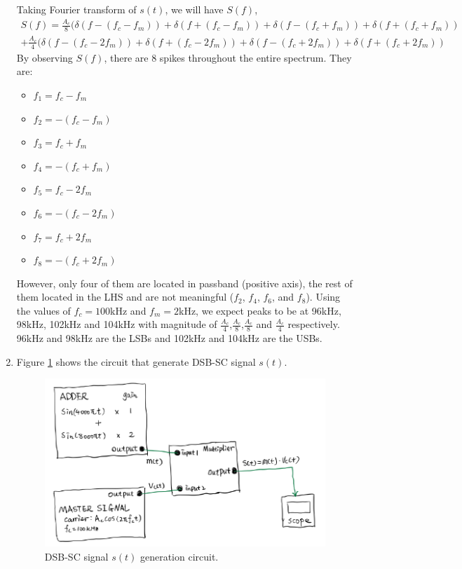 \documentclass[11pt]{article}
\begin{document}
\begin{enumerate}[label=(\alph*)]
\begin{itemize}
\end{itemize}
Taking Fourier transform of $s(t)$, we will have $S(f)$,
     \begin{align*}
    S(f)= \frac{A_c}{8} (\delta (f-(f_c-f_m)) +\delta (f+(f_c-f_m)) +\delta (f-(f_c+f_m)) +\delta (f+(f_c+f_m))\\
    +\frac{A_c}{4} (\delta (f-(f_c-2f_m)) +\delta (f+(f_c-2f_m)) +\delta (f-(f_c+2f_m)) +\delta (f+(f_c+2f_m))
    \end{align*}
By observing $S(f)$, there are 8 spikes throughout the entire spectrum. They are: 
\begin{multicols}{2}
\begin{itemize}
    \item $f_1=f_c-f_m$
    \item $f_2=-(f_c-f_m)$
    \item $f_3=f_c+f_m$
    \item $f_4=-(f_c+f_m)$
    \item $f_5=f_c-2f_m$
    \item $f_6=-(f_c-2f_m)$
    \item $f_7=f_c+2f_m$
    \item $f_8=-(f_c+2f_m)$
\end{itemize}
\end{multicols}
However, only four of them are located in passband (positive axis), the rest of them located in the LHS and are not meaningful ($f_2$, $f_4$, $f_6$, and $f_8$). Using the values of $f_c = 100$kHz and $f_m = 2$kHz, we expect peaks to be at 96kHz, 98kHz, 102kHz and 104kHz with magnitude of $\frac{A_c}{4}$,$\frac{A_c}{8}$,$\frac{A_c}{8}$ and $\frac{A_c}{4}$ respectively. 96kHz and 98kHz are the LSBs and 102kHz and 104kHz are the USBs.

\item %
Figure \ref{fig:2bcircuit} shows the circuit that generate DSB-SC signal $s(t)$.
\begin{figure}[H]
    \centering
    \includegraphics[scale = 1.3]{2bcircuit.PNG}
    \caption{\label{fig:2bcircuit}DSB-SC signal $s(t)$ generation circuit.}
\end{figure}


\end{enumerate}
\end{document}
